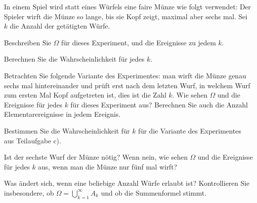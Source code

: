 In einem Spiel wird statt eines Würfels eine faire Münze wie folgt verwendet:
Der Spieler wirft die Münze so lange, bis sie Kopf zeigt, maximal aber sechs mal.
Sei $k$ die Anzahl der getätigten Würfe.
\begin{teilaufgaben}
\item
Beschreiben Sie $\Omega$ für dieses Experiment, und die Ereignisse zu jedem $k$.
\item
Berechnen Sie die Wahrscheinlichkeit für jedes $k$.
\item
Betrachten Sie folgende Variante des Experimentes: man wirft die Münze genau
sechs mal hintereinander und prüft erst nach dem letzten Wurf, in welchem Wurf
zum ersten Mal Kopf aufgetreten ist, dies ist die Zahl $k$.
Wie sehen $\Omega$ und die Ereignisse für jedes $k$ für dieses Experiment aus?
Berechnen Sie auch die Anzahl Elementarereignisse in jedem Ereignis.
\item 
Bestimmen Sie die Wahrscheinlichkeit für $k$ für die Variante des Experimentes
aus Teilaufgabe c).
\item
Ist der sechste Wurf der Münze nötig? Wenn nein, wie sehen $\Omega$ und die
Ereignisse für jedes $k$ aus, wenn man die Münze nur fünf mal wirft?
\item
Was ändert sich, wenn eine beliebige Anzahl Würfe erlaubt ist?
Kontrollieren Sie insbesondere, ob $\Omega=\bigcup_{k=1}^\infty A_k$
und ob die Summenformel stimmt.
\end{teilaufgaben}


